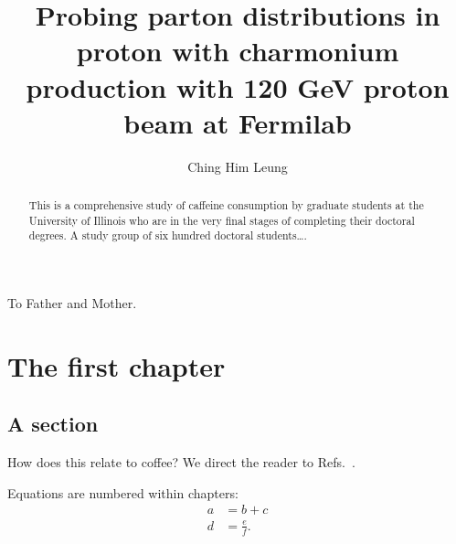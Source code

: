 \documentclass{uiucthesis2021}
\begin{document}
\title{Probing parton distributions in proton with charmonium production with
	120 GeV proton beam at Fermilab}
\author{Ching Him Leung}
\phdthesis
{}
\maketitle

\frontmatter

\begin{abstract}
This is a comprehensive study of caffeine consumption by graduate
students at the University of Illinois who are in the very final
stages of completing their doctoral degrees. A study group of six
hundred doctoral students\ldots.
\end{abstract}

\begin{dedication}
To Father and Mother.
\end{dedication}



{
	\hypersetup{linkcolor=black}  %
	\tableofcontents
	 \listoftables
	 \listoffigures
}


\mainmatter

\chapter{The first chapter}

\section{A section}

\lipsum[1-5]

How does this relate to coffee? We direct the reader to Refs.~\cite{Trembly98,Childish07,Presso10}.

Equations are numbered within chapters:
\begin{align}
	a
	&= b + c \\
	d
	&= \frac{e}{f}.
\end{align}

% 
% 
% 
% 
\end{document}
